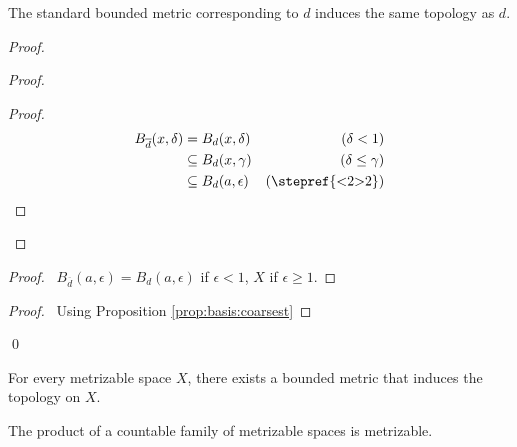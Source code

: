 \begin{prop}
  The standard bounded metric corresponding to $d$ induces the same topology as $d$.
\end{prop}

\begin{proof}
  \pf
  \begin{proof}
    \begin{proof}
      \pf
      \begin{align*}
      B_{\overline{d}}(x, \delta) & = B_d(x, \delta) & (\delta < 1) \\
      & \subseteq B_d(x, \gamma) & (\delta \leq \gamma) \\
      & \subseteq B_d(a, \epsilon) & (\text{\stepref{<2>2}})
    \end{align*}
    \end{proof}
  \end{proof}
  \begin{proof}
    \pf\ $B_{\overline{d}}(a, \epsilon) = B_d(a, \epsilon)$ if $\epsilon < 1$, $X$ if $\epsilon \geq 1$.
  \end{proof}
  \qedstep
  \begin{proof}
    \pf\ Using Proposition \ref{prop:basis:coarsest}
  \end{proof}
  \qed
\end{proof}

\begin{cor}
  For every metrizable space $X$, there exists a bounded metric that induces the topology on $X$.
\end{cor}

\begin{prop}
  The product of a countable family of metrizable spaces is metrizable.
\end{prop}


